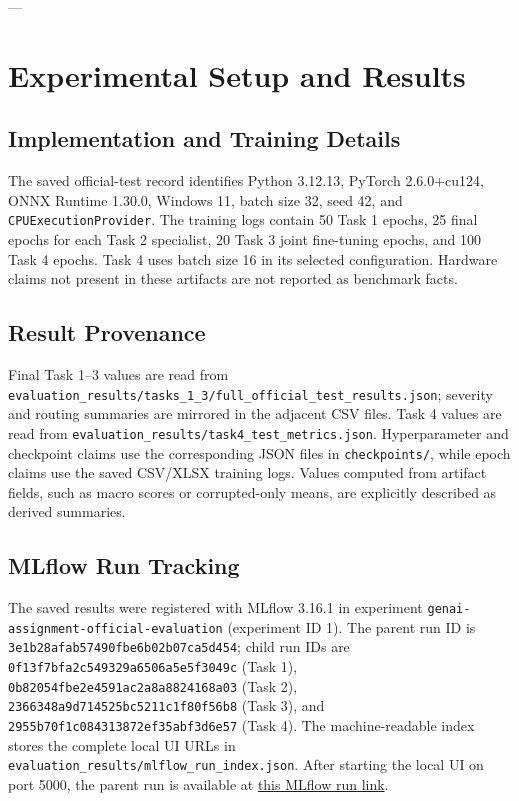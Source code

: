 \documentclass[journal,compsoc]{IEEEtran}
\begin{document}
---

\section{Experimental Setup and Results}
\label{sec:experiments}

\subsection{Implementation and Training Details}
The saved official-test record identifies Python 3.12.13, PyTorch 2.6.0+cu124, ONNX Runtime 1.30.0, Windows 11, batch size 32, seed 42, and \texttt{CPUExecutionProvider}. The training logs contain 50 Task 1 epochs, 25 final epochs for each Task 2 specialist, 20 Task 3 joint fine-tuning epochs, and 100 Task 4 epochs. Task 4 uses batch size 16 in its selected configuration. Hardware claims not present in these artifacts are not reported as benchmark facts.

\subsection{Result Provenance}
Final Task 1--3 values are read from \texttt{evaluation\_results/tasks\_1\_3/full\_official\_test\_results.json}; severity and routing summaries are mirrored in the adjacent CSV files. Task 4 values are read from \texttt{evaluation\_results/task4\_test\_metrics.json}. Hyperparameter and checkpoint claims use the corresponding JSON files in \texttt{checkpoints/}, while epoch claims use the saved CSV/XLSX training logs. Values computed from artifact fields, such as macro scores or corrupted-only means, are explicitly described as derived summaries.

\subsection{MLflow Run Tracking}
The saved results were registered with MLflow 3.16.1 in experiment \texttt{genai-assignment-official-evaluation} (experiment ID 1). The parent run ID is \texttt{3e1b28afab57490fbe6b02b07ca5d454}; child run IDs are \texttt{0f13f7bfa2c549329a6506a5e5f3049c} (Task 1), \texttt{0b82054fbe2e4591ac2a8a8824168a03} (Task 2), \texttt{2366348a9d714525bc5211c1f80f56b8} (Task 3), and \texttt{2955b70f1c084313872ef35abf3d6e57} (Task 4). The machine-readable index stores the complete local UI URLs in \texttt{evaluation\_results/mlflow\_run\_index.json}. After starting the local UI on port 5000, the parent run is available at \href{http://127.0.0.1:5000/\#/experiments/1/runs/3e1b28afab57490fbe6b02b07ca5d454}{this MLflow run link}.
\end{document}
